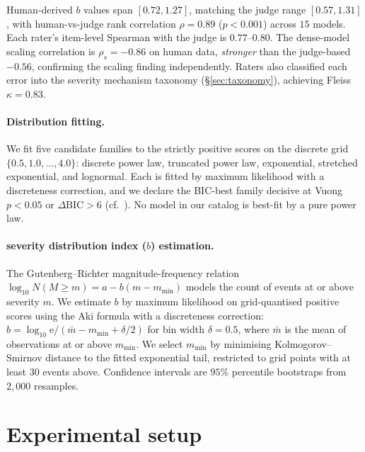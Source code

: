 \documentclass{article}
\newcommand{\sdi}{\ensuremath{b}}
\newcommand{\bvalue}{severity distribution index (\sdi)}
\begin{document}
Human-derived \sdi{} values span $[0.72, 1.27]$, matching the judge
range $[0.57, 1.31]$, with human-vs-judge rank correlation
$\rho = 0.89$ ($p < 0.001$) across $15$ models. Each rater's
item-level Spearman with the judge is $0.77$--$0.80$. The
dense-model scaling correlation is $\rho_s = -0.86$ on human data,
\emph{stronger} than the judge-based $-0.56$, confirming the scaling
finding independently. Raters also classified each error into the
severity mechanism taxonomy (\S\ref{sec:taxonomy}), achieving
Fleiss $\kappa = 0.83$.

\paragraph{Distribution fitting.} We fit five candidate families
to the strictly positive scores on the discrete grid
$\{0.5, 1.0, \ldots, 4.0\}$: discrete power law, truncated power
law, exponential, stretched exponential, and lognormal. Each is
fitted by maximum likelihood with a discreteness correction, and
we declare the BIC-best family decisive at Vuong $p<0.05$
\citep{vuong1989likelihood} or $\Delta\text{BIC}>6$
(cf.~\citealp{clauset2009power}). No model in our catalog is
best-fit by a pure power law.

\paragraph{\bvalue{} estimation.} The Gutenberg--Richter
magnitude-frequency relation
\citep{gutenberg1944frequency}
$\log_{10} N(M \geq m) = a - b(m - m_{\min})$
models the count of events at or above severity $m$. We estimate
$b$ by maximum likelihood on grid-quantised positive scores using
the Aki formula \citep{aki1965maximum} with a discreteness
correction: $\hat{b} = \log_{10}\mathrm{e} / (\bar{m} -
m_{\min} + \delta/2)$ for bin width $\delta = 0.5$, where $\bar{m}$
is the mean of observations at or above $m_{\min}$. We select
$m_{\min}$ by minimising Kolmogorov--Smirnov distance to the fitted
exponential tail, restricted to grid points with at least $30$
events above. Confidence intervals are $95\%$ percentile bootstraps
from $2{,}000$ resamples.

\section{Experimental setup}\label{sec:setup}
\end{document}
